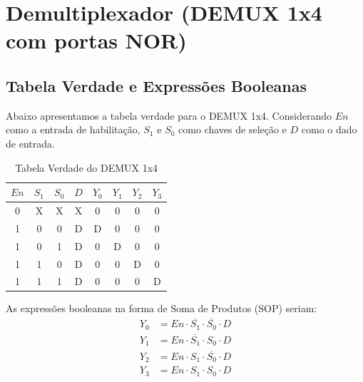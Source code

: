 \section{Demultiplexador (DEMUX 1x4 com portas NOR)}

\subsection{Tabela Verdade e Expressões Booleanas}
Abaixo apresentamos a tabela verdade para o DEMUX 1x4. Considerando $En$ como a entrada de habilitação, $S_1$ e $S_0$ como chaves de seleção e $D$ como o dado de entrada.

\begin{table}[H]
    \centering
    \caption{Tabela Verdade do DEMUX 1x4}
    \begin{tabular}{cccc|cccc}
        \toprule
        \textbf{$En$} & \textbf{$S_1$} & \textbf{$S_0$} & \textbf{$D$} & \textbf{$Y_0$} & \textbf{$Y_1$} & \textbf{$Y_2$} & \textbf{$Y_3$} \\
        \midrule
        0             & X              & X              & X            & 0              & 0              & 0              & 0              \\
        1             & 0              & 0              & D            & D              & 0              & 0              & 0              \\
        1             & 0              & 1              & D            & 0              & D              & 0              & 0              \\
        1             & 1              & 0              & D            & 0              & 0              & D              & 0              \\
        1             & 1              & 1              & D            & 0              & 0              & 0              & D              \\
        \bottomrule
    \end{tabular}
\end{table}

As expressões booleanas na forma de Soma de Produtos (SOP) seriam:
\begin{align*}
    Y_0 & = En \cdot \overline{S_1} \cdot \overline{S_0} \cdot D \\
    Y_1 & = En \cdot \overline{S_1} \cdot S_0 \cdot D            \\
    Y_2 & = En \cdot S_1 \cdot \overline{S_0} \cdot D            \\
    Y_3 & = En \cdot S_1 \cdot S_0 \cdot D
\end{align*}

